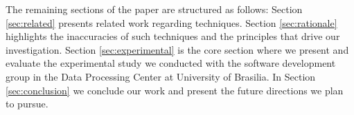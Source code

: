 
The remaining sections of the paper are structured as follows: Section \ref{sec:related} presents related work regarding  techniques. Section \ref{sec:rationale} highlights the inaccuracies of such techniques and the principles that drive our investigation. Section \ref{sec:experimental} is the core section where we present and evaluate the experimental study we conducted with the software development group in the Data Processing Center at University of Brasilia. In Section \ref{sec:conclusion} we conclude our work and present the future directions we plan to pursue.

